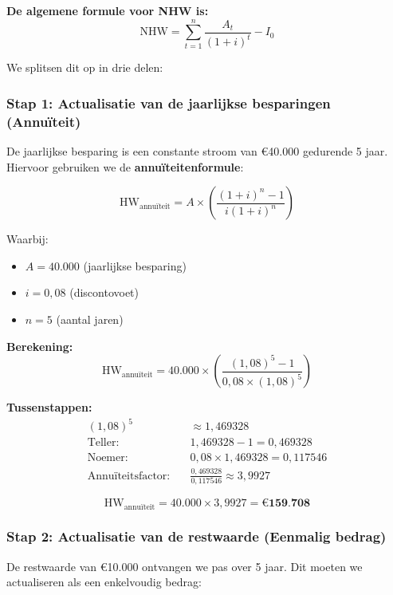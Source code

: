 \documentclass[a4paper,11pt]{article}
\begin{document}
\begin{oefenblok}
    \textbf{De algemene formule voor NHW is:}
    \[
        \text{NHW} = \sum_{t=1}^{n} \frac{A_t}{(1+i)^t} - I_0
    \]

    We splitsen dit op in drie delen:

    \subsubsection*{Stap 1: Actualisatie van de jaarlijkse besparingen (Annuïteit)}

    De jaarlijkse besparing is een constante stroom van €40.000 gedurende 5 jaar. Hiervoor gebruiken we de \textbf{annuïteitenformule}:

    \[
        \text{HW}_{\text{annuïteit}} = A \times \left( \frac{(1+i)^n - 1}{i(1+i)^n} \right)
    \]

    Waarbij:
    \begin{itemize}
        \item $A = 40.000$ (jaarlijkse besparing)
        \item $i = 0{,}08$ (discontovoet)
        \item $n = 5$ (aantal jaren)
    \end{itemize}

    \textbf{Berekening:}
    \[
        \text{HW}_{\text{annuïteit}} = 40.000 \times \left( \frac{(1{,}08)^5 - 1}{0{,}08 \times (1{,}08)^5} \right)
    \]

    \textbf{Tussenstappen:}
    \begin{align*}
        (1{,}08)^5                     & \approx 1{,}469328                        \\
        \text{Teller:} \quad           & 1{,}469328 - 1 = 0{,}469328                \\
        \text{Noemer:} \quad           & 0{,}08 \times 1{,}469328 = 0{,}117546      \\
        \text{Annuïteitsfactor:} \quad & \frac{0{,}469328}{0{,}117546} \approx 3{,}9927
    \end{align*}

    \[
        \text{HW}_{\text{annuïteit}} = 40.000 \times 3{,}9927 = \textbf{€159.708}
    \]

    \subsubsection*{Stap 2: Actualisatie van de restwaarde (Eenmalig bedrag)}

    De restwaarde van €10.000 ontvangen we pas over 5 jaar. Dit moeten we actualiseren als een enkelvoudig bedrag:


\end{oefenblok}
\end{document}
